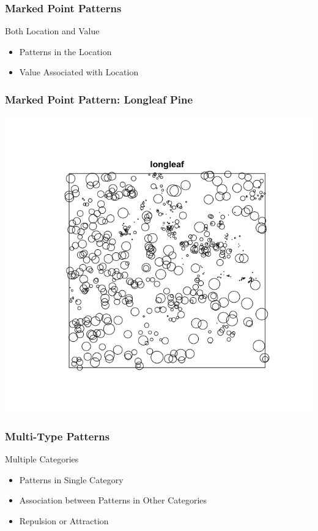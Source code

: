 \documentclass[nototal]{beamer}
\begin{document}
	 \begin{frame}
	   \frametitle{Marked Point Patterns}
	   \begin{block}{Both Location and Value}
	     \begin{itemize}
	       \item Patterns in the Location
	       \item Value Associated with Location
	     \end{itemize}
	    \end{block}
	  \end{frame}

	 \begin{frame}
	   \frametitle{Marked Point Pattern: Longleaf Pine}
	   \begin{center}
	     \includegraphics[width=.65\linewidth]{longleaf.png}
	   \end{center}
	 \end{frame}

	 \begin{frame}
	   \frametitle{Multi-Type Patterns}
	   \begin{block}{Multiple Categories}
	     \begin{itemize}
	       \item Patterns in Single Category
	       \item Association between Patterns in Other Categories
	       \item Repulsion or Attraction
	     \end{itemize}
	    \end{block}
	  \end{frame}
\end{document}
